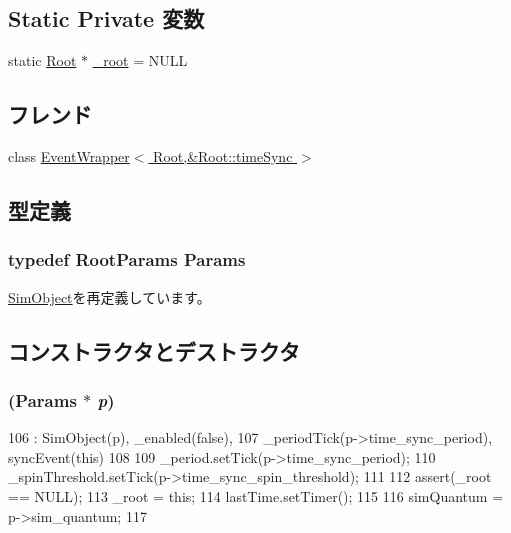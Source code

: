 \subsection*{Static Private 変数}
\begin{DoxyCompactItemize}
\item 
static \hyperlink{classRoot_1_1Root}{Root} $\ast$ \hyperlink{classRoot_a99366a4f856d83fbfa33f9a97441512b}{\_\-root} = NULL
\end{DoxyCompactItemize}
\subsection*{フレンド}
\begin{DoxyCompactItemize}
\item 
class \hyperlink{classRoot_a47a21fa8d012ff7d9657be29b3e52ee1}{EventWrapper$<$ Root,\&Root::timeSync $>$}
\end{DoxyCompactItemize}


\subsection{型定義}
\hypertarget{classRoot_a0e87bb7e60cbe3229b1cb552ebb686e0}{
\subsubsection[{Params}]{\setlength{\rightskip}{0pt plus 5cm}typedef RootParams {\bf Params}}}
\label{classRoot_a0e87bb7e60cbe3229b1cb552ebb686e0}


\hyperlink{classSimObject_a0f0761d2db586a23bb2a2880b8f387bb}{SimObject}を再定義しています。

\subsection{コンストラクタとデストラクタ}
\hypertarget{classRoot_abc86df64e340cf2d26b91bb2006f6823}{
\subsubsection[{Root}]{ ({\bf Params} $\ast$ {\em p})}}
\label{classRoot_abc86df64e340cf2d26b91bb2006f6823}



\begin{DoxyCode}
106                         : SimObject(p), _enabled(false),
107     _periodTick(p->time_sync_period), syncEvent(this)
108 {
109     _period.setTick(p->time_sync_period);
110     _spinThreshold.setTick(p->time_sync_spin_threshold);
111 
112     assert(_root == NULL);
113     _root = this;
114     lastTime.setTimer();
115 
116     simQuantum = p->sim_quantum;
117 }
\end{DoxyCode}


